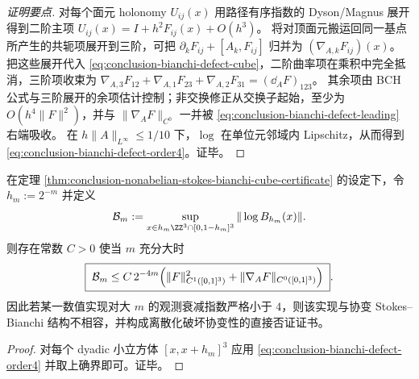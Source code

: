 \begin{proof}[证明要点]
对每个面元 holonomy \(U_{ij}(x)\) 用路径有序指数的 Dyson/Magnus 展开得到二阶主项
\(
U_{ij}(x)=I+h^2F_{ij}(x)+O(h^3)
\)。
将对顶面元搬运回同一基点所产生的共轭项展开到三阶，可把 \(\partial_kF_{ij}+[A_k,F_{ij}]\) 归并为 \((\nabla_{A,k}F_{ij})(x)\)。
把这些展开代入 \eqref{eq:conclusion-bianchi-defect-cube}，二阶曲率项在乘积中完全抵消，三阶项收束为
\(
\nabla_{A,3}F_{12}+\nabla_{A,1}F_{23}+\nabla_{A,2}F_{31}
=(\dd_A F)_{123}
\)。
其余项由 BCH 公式与三阶展开的余项估计控制；非交换修正从交换子起始，至少为 \(O(h^4\|F\|^2)\)，并与 \(\|\nabla_A F\|_{C^0}\) 一并被 \eqref{eq:conclusion-bianchi-defect-leading} 右端吸收。
在 \(h\|A\|_{L^\infty}\le 1/10\) 下，\(\log\) 在单位元邻域内 Lipschitz，从而得到 \eqref{eq:conclusion-bianchi-defect-order4}。证毕。
\end{proof}

\begin{corollary}\label{cor:conclusion-nonabelian-bianchi-dyadic-audit-threshold}
在定理 \ref{thm:conclusion-nonabelian-stokes-bianchi-cube-certificate} 的设定下，令 \(h_m:=2^{-m}\) 并定义
\[
\mathcal B_m
:=\sup_{x\in h_m\ZZ^{3}\cap[0,1-h_m]^3}\|\log B_{h_m}(x)\|.
\]
则存在常数 \(C>0\) 使当 \(m\) 充分大时
\[
\boxed{\;
\mathcal B_m
\le
C\,2^{-4m}\Bigl(\|F\|_{C^1([0,1]^3)}^{2}+\|\nabla_A F\|_{C^0([0,1]^3)}\Bigr)\; }.
\]
因此若某一数值实现对大 \(m\) 的观测衰减指数严格小于 \(4\)，则该实现与协变 Stokes--Bianchi 结构不相容，并构成离散化破坏协变性的直接否证证书。
\end{corollary}
\begin{proof}
对每个 dyadic 小立方体 \([x,x+h_m]^3\) 应用 \eqref{eq:conclusion-bianchi-defect-order4} 并取上确界即可。证毕。
\end{proof}

